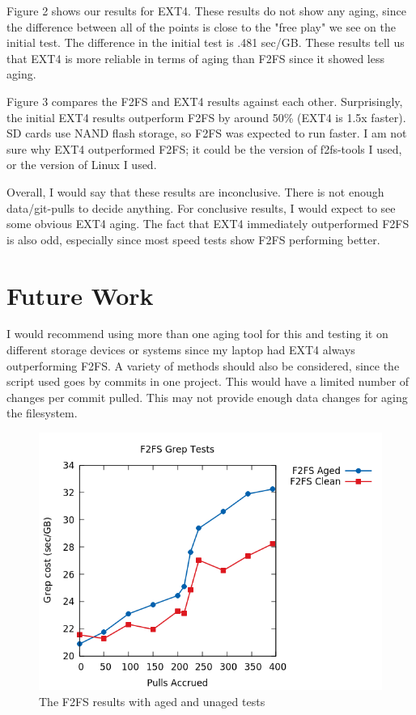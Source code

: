 \documentclass[a4paper, 10pt, conference]{ieeeconf}
\begin{document}
Figure 2 shows our results for EXT4. These results do not show any aging, 
since the difference between all of the points is close to the "free play" we
see on the initial test. The difference in the initial test is .481 sec/GB. 
These results tell us that EXT4 is more reliable in terms of aging than F2FS
since it showed less aging.

Figure 3 compares the F2FS and EXT4 results against each other. Surprisingly,
the initial EXT4 results outperform F2FS by around 50\% (EXT4 is 1.5x faster).
SD cards use NAND flash storage, so F2FS was expected to run faster. I am not
sure why EXT4 outperformed F2FS; it could be the version of f2fs-tools I used,
or the version of Linux I used. 

Overall, I would say that these results are inconclusive. There is not enough
data/git-pulls to decide anything. For conclusive results, I would expect to 
see some obvious EXT4 aging. The fact that EXT4 immediately outperformed F2FS
is also odd, especially since most speed tests show F2FS performing better. 


\section{Future Work}

I would recommend using more than one aging tool for this and testing it on different
storage devices or systems since my laptop had EXT4 always outperforming F2FS. A variety of
methods should also be considered, since the script used goes by commits in one project.
This would have a limited number of changes per commit pulled. This may not provide enough
data changes for aging the filesystem.

\begin{figure}
	\includegraphics[width=\linewidth]{f2fs_aged.png}
	\caption{The F2FS results with aged and unaged tests}
	\label{fig:f2fs}
\end{figure}
\end{document}
